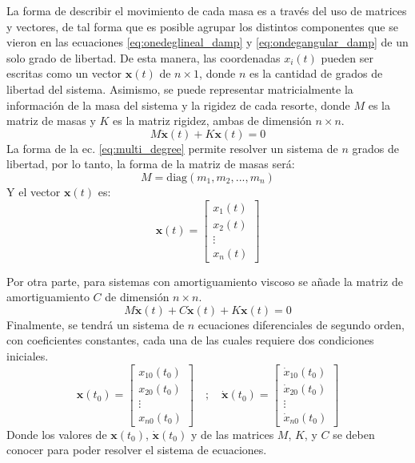 La forma de describir el movimiento de cada masa es a través del uso de matrices y vectores, de tal forma que es posible agrupar los distintos componentes que se vieron en las ecuaciones \ref{eq:onedeglineal_damp} y \ref{eq:ondegangular_damp} de un solo grado de libertad. De esta manera, las coordenadas $x_i(t)$ pueden ser escritas como un vector $\mathbf{x}(t)$ de $n \times 1$, donde $n$ es la cantidad de grados de libertad del sistema. Asimismo, se puede representar matricialmente la información de la masa del sistema y la rigidez de cada resorte, donde $\mathit{M}$ es la matriz de masas y $\mathit{K}$ es la matriz rigidez, ambas de dimensión $n \times n$. 
\begin{equation}\label{eq:multi_degree}
	\mathit{M}\mathbf{\ddot{x}}(t) + \mathit{K}\mathbf{x}(t) = 0
\end{equation}
La forma de la ec. \ref{eq:multi_degree} permite resolver un sistema de $n$ grados de libertad, por lo tanto, la forma de la matriz de masas será:
\begin{equation*}
	\mathit{M}=\text{diag}(m_1,m_2,...,m_n)
\end{equation*}
Y el vector $\mathbf{x}(t)$ es:
\begin{equation*}
	\mathbf{x}(t) = \begin{bmatrix}
	x_1(t)\\
	x_2(t)\\
	\vdots\\
	x_n(t)
	\end{bmatrix}
\end{equation*} 

\bigskip

Por otra parte, para sistemas con amortiguamiento viscoso se añade la matriz de amortiguamiento $\mathit{C}$ de dimensión $n \times n$. 
\begin{equation}\label{eq:multi_degreedamp}
	\mathit{M}\mathbf{\ddot{x}}(t) + \mathit{C}\mathbf{\dot{x}}(t) + \mathit{K}\mathbf{x}(t) = 0	
\end{equation}
Finalmente, se tendrá un sistema de $n$ ecuaciones diferenciales de segundo orden, con coeficientes constantes, cada una de las cuales requiere dos condiciones iniciales.
\begin{equation}
	\mathbf{x}(t_0) = \begin{bmatrix}
	x_{10}(t_0)\\
	x_{20}(t_0)\\
	\vdots\\
	x_{n0}(t_0)
	\end{bmatrix} \quad ; \quad \mathbf{\dot{x}}(t_0) = \begin{bmatrix}
	\dot{x}_{10}(t_0)\\
	\dot{x}_{20}(t_0)\\
	\vdots\\
	\dot{x}_{n0}(t_0)
	\end{bmatrix}
\end{equation}
Donde los valores de $\mathbf{x}(t_0)$, $\mathbf{\dot{x}}(t_0)$ y de las matrices $\mathit{M}$, $\mathit{K}$, y $\mathit{C}$ se deben conocer para poder resolver el sistema de ecuaciones. 


